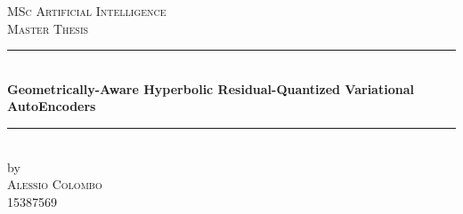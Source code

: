 \documentclass[12pt]{report}
\begin{document}
\begin{titlepage}



\newcommand{\HRule}{\rule{\linewidth}{0.5mm}} %

\center %

 





\textsc{\Large MSc Artificial Intelligence}\\[0.2cm]

\textsc{\Large Master Thesis}\\[0.5cm] 








\HRule \\[0.4cm]

{ \huge \bfseries Geometrically-Aware Hyperbolic Residual-Quantized Variational AutoEncoders}\\[0.4cm] %

\HRule \\[0.5cm]

 






by\\[0.2cm]

\textsc{\Large Alessio Colombo}\\[0.2cm] %

15387569\\[1cm]






\end{titlepage}
\end{document}
